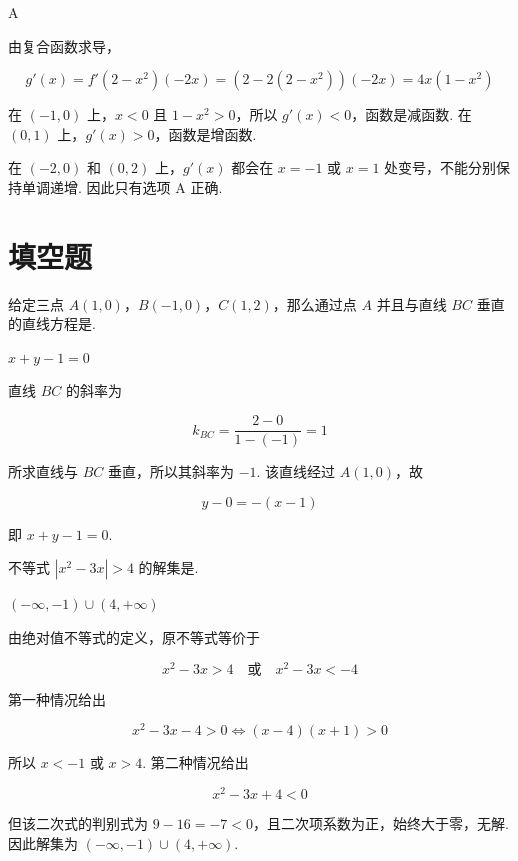 \documentclass[UTF8,a4paper,oneside,11pt]{ctexbook}
\begin{document}
\begin{answer}
A
\end{answer}

\begin{solution}
由复合函数求导，

\[g'(x)=f'(2-x^2)(-2x)=\left(2-2(2-x^2)\right)(-2x)=4x(1-x^2)\]

在 \((-1,0)\) 上，\(x<0\) 且 \(1-x^2>0\)，所以 \(g'(x)<0\)，函数是减函数. 在 \((0,1)\) 上，\(g'(x)>0\)，函数是增函数.

在 \((-2,0)\) 和 \((0,2)\) 上，\(g'(x)\) 都会在 \(x=-1\) 或 \(x=1\) 处变号，不能分别保持单调递增. 因此只有选项 A 正确.
\end{solution}

\section{填空题}

\begin{problem}
给定三点 \(A(1,0)\)，\(B(-1,0)\)，\(C(1,2)\)，那么通过点 \(A\) 并且与直线 \(BC\) 垂直的直线方程是\fillinblank{}.
\end{problem}

\begin{answer}
\(x+y-1=0\)
\end{answer}

\begin{solution}
直线 \(BC\) 的斜率为

\[k_{BC}=\frac{2-0}{1-(-1)}=1\]

所求直线与 \(BC\) 垂直，所以其斜率为 \(-1\). 该直线经过 \(A(1,0)\)，故

\[y-0=-(x-1)\]

即 \(x+y-1=0\).
\end{solution}

\begin{problem}
不等式 \(|x^2 - 3x| > 4\) 的解集是\fillinblank{}.
\end{problem}

\begin{answer}
\(\left(-\infty,-1\right)\cup\left(4,+\infty\right)\)
\end{answer}

\begin{solution}
由绝对值不等式的定义，原不等式等价于

\[x^2-3x>4\quad\text{或}\quad x^2-3x<-4\]

第一种情况给出

\[x^2-3x-4>0\Longleftrightarrow (x-4)(x+1)>0\]

所以 \(x<-1\) 或 \(x>4\). 第二种情况给出

\[x^2-3x+4<0\]

但该二次式的判别式为 \(9-16=-7<0\)，且二次项系数为正，始终大于零，无解. 因此解集为 \(\left(-\infty,-1\right)\cup\left(4,+\infty\right)\).
\end{solution}
\end{document}
